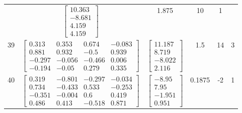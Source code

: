 \documentclass[a4paper,12pt]{article}
\begin{document}
\begin{tabular}{c c c c c c}
&
$\begin{bmatrix} 10.363 \\ -8.681 \\ 4.159 \\ 4.159 \end{bmatrix}$
&
1.875
&
10
&
1
\\
39
&
$\begin{bmatrix} 0.313 & 0.353 & 0.674 & -0.083 \\ 0.881 & 0.932 & -0.5 & 0.939 \\ -0.297 & -0.056 & -0.466 & 0.006 \\ -0.194 & -0.05 & 0.279 & 0.335 \end{bmatrix}$
&
$\begin{bmatrix} 11.187 \\ 8.719 \\ -8.022 \\ 2.116 \end{bmatrix}$
&
1.5
&
14
&
3
\\
40
&
$\begin{bmatrix} 0.319 & -0.801 & -0.297 & -0.034 \\ 0.734 & -0.433 & 0.533 & -0.253 \\ -0.351 & -0.004 & 0.6 & 0.419 \\ 0.486 & 0.413 & -0.518 & 0.871 \end{bmatrix}$
&
$\begin{bmatrix} -8.95 \\ 7.95 \\ -1.951 \\ 0.951 \end{bmatrix}$
&
0.1875
&
-2
&
1
\\
\end{tabular} \egroup \newpage
\end{document}
